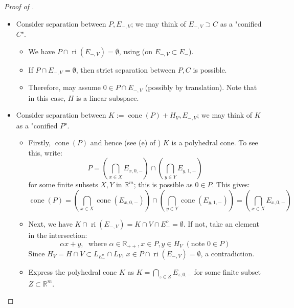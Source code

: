 \begin{proof}[Proof of ]
\begin{itemize}
\[\begin{tikzcd}
			      \end{tikzcd}
		      \]
		      with the property that for each subgraph $A\leftarrow B\rightarrow C$, we have $B=A\cap C$. Note that the second and third rows are just the intersection of the first row with $V$ or $C$.
		\item Consider separation between $P,E_{-,V}$; we may think of $E_{-,V}\supset C$ as a "conified $C$".
		      \begin{itemize}
			      \item We have $P\cap \operatorname{ri}(E_{-,V})=\emptyset$, using  (on $E_{-,V}\subset E_{-}$).
			      \item If $P\cap E_{-,V}=\emptyset$, then strict separation between $P,C$ is possible.
			      \item Therefore, may assume $0\in P\cap E_{-,V}$ (possibly by translation). Note that in this case, $H$ is a linear subspace.
		      \end{itemize}
		\item Consider separation between $K:=\operatorname{cone}(P)+H_V,E_{-,V}$; we may think of $K$ as a "conified $P$".
		      \begin{itemize}
			      \item Firstly, $\operatorname{cone}(P)$ and hence (see (e) of ) $K$ is a polyhedral cone. To see this, write:
			            \[
				            P=\left(\bigcap_{x\in X}E_{x,0,-}\right)\cap\left(\bigcap_{y\in Y}E_{y,1,-}\right)
			            \]
			            for some finite subsets $X,Y$ in $\mathbb{R}^m$; this is possible as $0\in P$. This gives:
			            \[
				            \operatorname{cone}(P)=\left(\bigcap_{x\in X}\operatorname{cone}(E_{x,0,-})\right)\cap\left(\bigcap_{y\in Y}\operatorname{cone}(E_{y,1,-})\right)
				            =\left(\bigcap_{x\in X}E_{x,0,-}\right)
			            \]
			      \item Next, we have $K\cap \operatorname{ri}(E_{-,V})=K\cap V\cap E_{-}^o=\emptyset$. If not, take an element in the intersection:
			            \[
				            \alpha x+y,\;\text{ where }\alpha \in \mathbb{R}_{++}, x\in P, y\in H_V\;(\text{note }0\in P)
			            \]
			            Since $H_V=H\cap V\subset L_{E^o_-}\cap L_{V}$, $x\in P\cap \operatorname{ri}(E_{-,V})=\emptyset$, a contradiction.
			      \item Express the polyhedral cone $K$ as $K=\bigcap_{z\in Z}E_{z,0,-}$ for some finite subset $Z\subset \mathbb{R}^m$.
			            \begin{itemize}

\end{itemize}
\end{itemize}
\end{itemize}
\end{proof}
